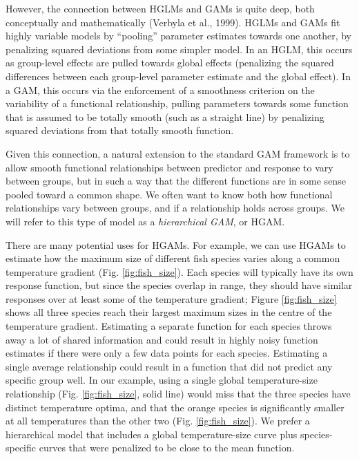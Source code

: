\documentclass[12pt]{article}
\begin{document}
However, the connection between HGLMs and GAMs is quite deep, both
conceptually and mathematically (Verbyla et al., 1999). HGLMs and GAMs
fit highly variable models by ``pooling'' parameter estimates towards
one another, by penalizing squared deviations from some simpler model.
In an HGLM, this occurs as group-level effects are pulled towards global
effects (penalizing the squared differences between each group-level
parameter estimate and the global effect). In a GAM, this occurs via the
enforcement of a smoothness criterion on the variability of a functional
relationship, pulling parameters towards some function that is assumed
to be totally smooth (such as a straight line) by penalizing squared
deviations from that totally smooth function.

Given this connection, a natural extension to the standard GAM framework
is to allow smooth functional relationships between predictor and
response to vary between groups, but in such a way that the different
functions are in some sense pooled toward a common shape. We often want
to know both how functional relationships vary between groups, and if a
relationship holds across groups. We will refer to this type of model as
a \emph{hierarchical GAM}, or HGAM.

There are many potential uses for HGAMs. For example, we can use HGAMs
to estimate how the maximum size of different fish species varies along
a common temperature gradient (Fig. \ref{fig:fish_size}). Each species
will typically have its own response function, but since the species
overlap in range, they should have similar responses over at least some
of the temperature gradient; Figure \ref{fig:fish_size} shows all three
species reach their largest maximum sizes in the centre of the
temperature gradient. Estimating a separate function for each species
throws away a lot of shared information and could result in highly noisy
function estimates if there were only a few data points for each
species. Estimating a single average relationship could result in a
function that did not predict any specific group well. In our example,
using a single global temperature-size relationship (Fig.
\ref{fig:fish_size}, solid line) would miss that the three species have
distinct temperature optima, and that the orange species is
significantly smaller at all temperatures than the other two (Fig.
\ref{fig:fish_size}). We prefer a hierarchical model that includes a
global temperature-size curve plus species-specific curves that were
penalized to be close to the mean function.
\end{document}
